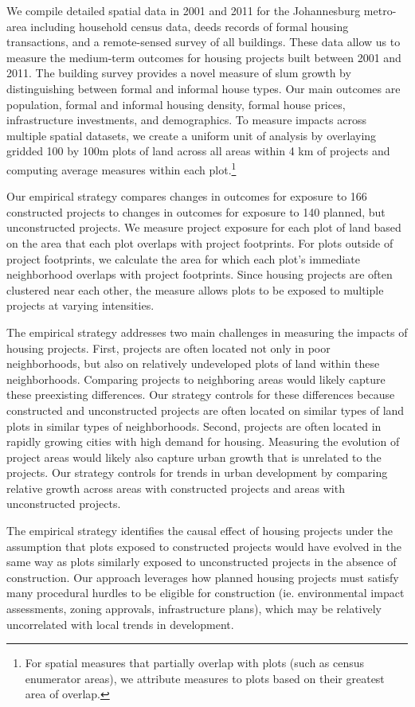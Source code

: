\documentclass[12pt]{article}
\newcommand{\rv}{}
\begin{document}
We compile detailed spatial data in 2001 and 2011 for the Johannesburg metro-area including household census data, deeds records of formal housing transactions, and a remote-sensed survey of all buildings.  These data allow us to measure the medium-term outcomes for housing projects built between 2001 and 2011.   The building survey provides a novel measure of slum growth by distinguishing between formal and informal house types.  Our main outcomes are population, formal and informal housing density, formal house prices, infrastructure investments, and demographics. To measure impacts across multiple spatial datasets, we create a uniform unit of analysis by overlaying gridded 100 by 100m plots of land across all areas within 4 km of projects and computing average measures within each plot.\footnote{For spatial measures that partially overlap with plots (such as census enumerator areas), we attribute measures to plots based on their greatest area of overlap.} 

Our empirical strategy compares changes in outcomes for exposure to 166 constructed projects to changes in outcomes for exposure to 140 planned, but unconstructed projects.  \rv{We measure project exposure for each plot of land based on the area that each plot overlaps with project footprints.  For plots outside of project footprints, we calculate the area for which each plot's immediate neighborhood overlaps with project footprints.  Since housing projects are often clustered near each other, the measure allows plots to be exposed to multiple projects at varying intensities.}  

\rv{The empirical strategy addresses two main challenges in measuring the impacts of housing projects.  First, projects are often located not only in poor neighborhoods, but also on relatively undeveloped plots of land within these neighborhoods.  Comparing projects to neighboring areas would likely capture these preexisting differences.  Our strategy controls for these differences because constructed and unconstructed projects are often located on similar types of land plots in similar types of neighborhoods.  Second, projects are often located in rapidly growing cities with high demand for housing.  Measuring the evolution of project areas would likely also capture urban growth that is unrelated to the projects.  Our strategy controls for trends in urban development by comparing relative growth across areas with constructed projects and areas with unconstructed projects.}

The empirical strategy identifies the causal effect of housing projects under the assumption that plots exposed to constructed projects would have evolved in the same way as plots similarly exposed to unconstructed projects in the absence of construction.  Our approach leverages how planned housing projects must satisfy many procedural hurdles to be eligible for construction (ie. environmental impact assessments, zoning approvals, infrastructure plans), which \rv{may be relatively uncorrelated} with local trends in development.  
\end{document}
